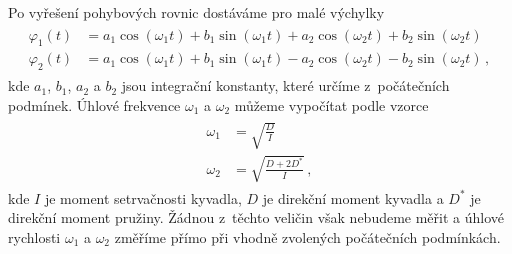 Po vyřešení pohybových rovnic dostáváme pro malé výchylky \cite{ZFP}
\begin{align}
\label{eq::phiobecne}
\begin{split}
 \varphi _1(t) &= a_1 \cos (\omega _1 t) + b_1 \sin (\omega _1 t) + a_2 \cos (\omega_2 t) + b_2 \sin(\omega_2 t)
\\
 \varphi _2(t) &= a_1 \cos (\omega _1 t) + b_1 \sin (\omega _1 t) - a_2 \cos (\omega_2 t) - b_2 \sin(\omega_2 t) \,,
\end{split}
\end{align}
kde $a_1$, $b_1$, $a_2$ a $b_2$ jsou integrační konstanty, které určíme z~počátečních podmínek.
Úhlové frekvence $\omega _1$ a $\omega _2$ můžeme vypočítat podle vzorce \cite{ZFP}
\begin{align}
\label{eq::omegadirekcni}
\begin{split}
 \omega_1 &= \sqrt{\frac{D}{I}}
\\
 \omega_2 &= \sqrt{\frac{D+2D^{\ast}}{I}} \,,
\end{split}
\end{align}
kde $I$ je moment setrvačnosti kyvadla, $D$ je direkční moment kyvadla a $D^{\ast}$ je direkční moment pružiny. Žádnou z~těchto veličin však nebudeme měřit a úhlové rychlosti $\omega _1$ a $\omega _2$ změříme přímo při vhodně zvolených počátečních podmínkách.

